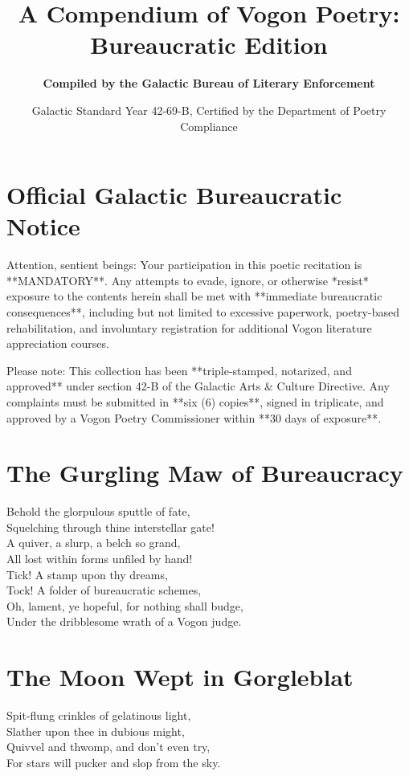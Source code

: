 \documentclass[a4paper,12pt]{article}
\title{\Huge\textbf{A Compendium of Vogon Poetry: Bureaucratic Edition}}
\author{\textbf{Compiled by the Galactic Bureau of Literary Enforcement}}
\date{Galactic Standard Year 42-69-B, Certified by the Department of Poetry Compliance}
\begin{document}
	
	\maketitle
	
	\newpage
	\section*{Official Galactic Bureaucratic Notice}
	\noindent Attention, sentient beings: Your participation in this poetic recitation is **MANDATORY**. Any attempts to evade, ignore, or otherwise *resist* exposure to the contents herein shall be met with **immediate bureaucratic consequences**, including but not limited to excessive paperwork, poetry-based rehabilitation, and involuntary registration for additional Vogon literature appreciation courses.
	
	\noindent Please note: This collection has been **triple-stamped, notarized, and approved** under section 42-B of the Galactic Arts \& Culture Directive. Any complaints must be submitted in **six (6) copies**, signed in triplicate, and approved by a Vogon Poetry Commissioner within **30 days of exposure**.
	
	\newpage
	\tableofcontents
	
	\newpage
	
	\section{The Gurgling Maw of Bureaucracy}
	\vfill
	\raggedright
	Behold the glorpulous sputtle of fate,\\
	Squelching through thine interstellar gate!\\
	A quiver, a slurp, a belch so grand,\\
	All lost within forms unfiled by hand!\\
	
	Tick! A stamp upon thy dreams,\\
	Tock! A folder of bureaucratic schemes,\\
	Oh, lament, ye hopeful, for nothing shall budge,\\
	Under the dribblesome wrath of a Vogon judge.\\
	\vfill\newpage
	
	\section{The Moon Wept in Gorgleblat}
	\vfill
	\raggedright
	Spit-flung crinkles of gelatinous light,\\
	Slather upon thee in dubious might,\\
	Quivvel and thwomp, and don’t even try,\\
	For stars will pucker and slop from the sky.\\
	
\end{document}
